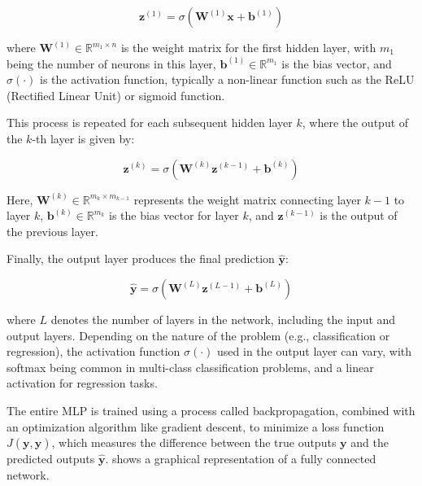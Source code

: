 \begin{equation}
 \mathbf{z}^{(1)} = \sigma\left(\mathbf{W}^{(1)}\mathbf{x} + \mathbf{b}^{(1)}\right)   
    \label{eq:output_neuron}
\end{equation}



where $\mathbf{W}^{(1)} \in \mathbb{R}^{m_1 \times n}$ is the weight matrix for the first hidden layer, with $m_1$ being the number of neurons in this layer, $\mathbf{b}^{(1)} \in \mathbb{R}^{m_1}$ is the bias vector, and $\sigma(\cdot)$ is the activation function, typically a non-linear function such as the ReLU (Rectified Linear Unit) or sigmoid function.

This process is repeated for each subsequent hidden layer $k$, where the output of the $k$-th layer is given by:

\begin{equation}
 \mathbf{z}^{(k)} = \sigma\left(\mathbf{W}^{(k)}\mathbf{z}^{(k-1)} + \mathbf{b}^{(k)}\right) 
    \label{eq:hidden_layers_output}
\end{equation}


Here, $\mathbf{W}^{(k)} \in \mathbb{R}^{m_k \times m_{k-1}}$ represents the weight matrix connecting layer $k-1$ to layer $k$, $\mathbf{b}^{(k)} \in \mathbb{R}^{m_k}$ is the bias vector for layer $k$, and $\mathbf{z}^{(k-1)}$ is the output of the previous layer.

Finally, the output layer produces the final prediction $\mathbf{\hat{y}}$:

\begin{equation}
 \mathbf{\hat{y}} = \sigma\left(\mathbf{W}^{(L)}\mathbf{z}^{(L-1)} + \mathbf{b}^{(L)}\right)   
    \label{eq:output_layer}
\end{equation}

where $L$ denotes the number of layers in the network, including the input and output layers. Depending on the nature of the problem (e.g., classification or regression), the activation function $\sigma(\cdot)$ used in the output layer can vary, with softmax being common in multi-class classification problems, and a linear activation for regression tasks.

The entire MLP is trained using a process called backpropagation, combined with an optimization algorithm like gradient descent, to minimize a loss function $J(\mathbf{y}, \mathbf{\hat{y}})$, which measures the difference between the true outputs $\mathbf{y}$ and the predicted outputs $\mathbf{\hat{y}}$.  shows a graphical representation of a fully connected network.


